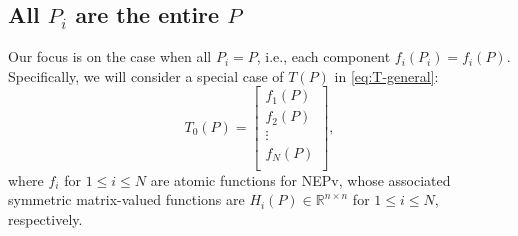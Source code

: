 \documentclass[11pt]{article}
\def\bx{\pmb{x}}
\def\bbR{\mathbb{R}}
\newcommand\STM[2]{{\rm St}(#1,#2)}
\DeclareMathOperator{\T}{T}
\def\Blue{\textcolor{blue}}
\theoremstyle{definition}
\numberwithin{equation}{section}
\begin{document}
\subsection{All $P_i$ are the entire $P$}\label{ssec:PieqP}
Our  focus is on
the case when all $P_i=P$, i.e., each component $f_i(P_i)=f_i(P)$.
Specifically, we will consider a special case of $T(P)$ in \eqref{eq:T-general}:
\begin{equation}\label{eq:T0-general:NEPv}
T_0(P)=\begin{bmatrix}
                                        f_1(P) \\
                                        f_2(P) \\
                                        \vdots \\
                                        f_N(P) \\
                                      \end{bmatrix},
\end{equation}
where $f_i$ for $1\le i\le N$ are atomic functions for NEPv, whose associated
symmetric matrix-valued functions are $H_i(P)\in\bbR^{n\times n}$ for $1\le i\le N$, respectively.
\end{document}

